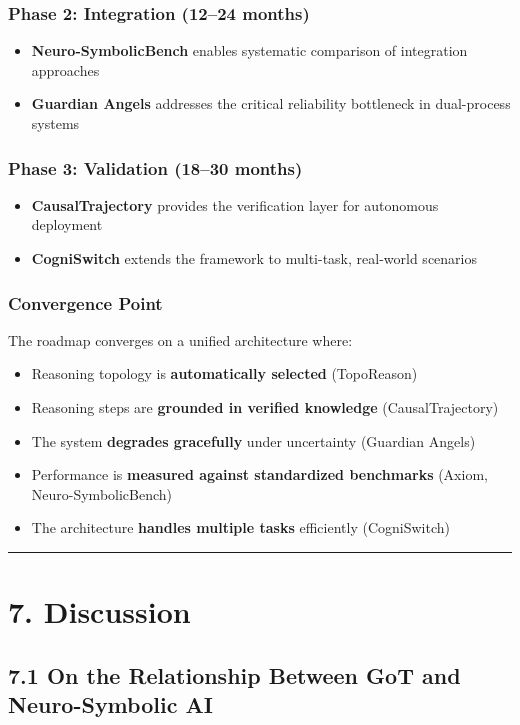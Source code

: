 \documentclass[11pt,a4paper]{article}
\begin{document}
\subsubsection{Phase 2: Integration (12–24 months)}
\begin{itemize}
  \item \textbf{Neuro-SymbolicBench} enables systematic comparison of integration approaches
  \item \textbf{Guardian Angels} addresses the critical reliability bottleneck in dual-process systems
\end{itemize}

\subsubsection{Phase 3: Validation (18–30 months)}
\begin{itemize}
  \item \textbf{CausalTrajectory} provides the verification layer for autonomous deployment
  \item \textbf{CogniSwitch} extends the framework to multi-task, real-world scenarios
\end{itemize}

\subsubsection{Convergence Point}
The roadmap converges on a unified architecture where:
\begin{itemize}
  \item Reasoning topology is \textbf{automatically selected} (TopoReason)
  \item Reasoning steps are \textbf{grounded in verified knowledge} (CausalTrajectory)
  \item The system \textbf{degrades gracefully} under uncertainty (Guardian Angels)
  \item Performance is \textbf{measured against standardized benchmarks} (Axiom, Neuro-SymbolicBench)
  \item The architecture \textbf{handles multiple tasks} efficiently (CogniSwitch)
\end{itemize}

\noindent\rule{\textwidth}{0.4pt}

\section{7. Discussion}

\subsection{7.1 On the Relationship Between GoT and Neuro-Symbolic AI}
\end{document}
